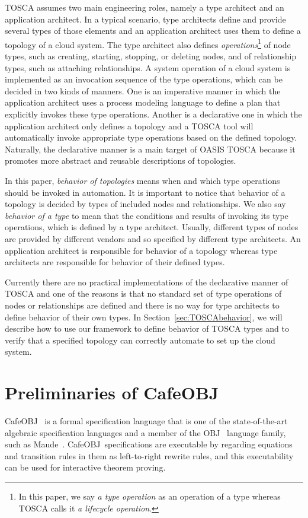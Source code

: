 \documentclass[12pt]{report}
\newcommand{\cafeobj}{{\sf CafeOBJ}~}
\begin{document}
TOSCA assumes two main engineering roles, namely a type architect and an
application architect. In a typical scenario, type architects define
and provide several types of those elements and an application
architect uses them to define a topology of a cloud system. The
type architect also defines {\it operations}\footnote{In this paper, we say
  {\it a type operation} as an operation of a type whereas TOSCA calls
  it {\it a lifecycle operation}.} of node types, such as creating,
starting, stopping, or deleting nodes, and of relationship types, such
as attaching relationships. A system operation of a cloud system
is implemented as an invocation sequence of the type operations, which
can be decided in two kinds of manners. One is an imperative manner in
which the application architect uses a process modeling language to
define a plan that explicitly invokes these type operations. Another
is a declarative one in which the application architect only defines a
topology and a TOSCA tool will automatically invoke appropriate type
operations based on the defined topology. Naturally, the declarative
manner is a main target of OASIS TOSCA because it promotes more
abstract and reusable descriptions of topologies.

In this paper, {\it behavior of topologies} means when
and which type operations should be invoked in automation. It is
important to notice that behavior of a topology is decided by
types of included nodes and relationships. We also say
{\it behavior of a type} to mean that the conditions and
results of invoking its type operations, which is defined by a type
architect. Usually, different types of nodes are provided by different
vendors and so specified by different type architects. An application
architect is responsible for behavior of a topology
whereas type architects are responsible for behavior of
their defined types.

Currently there are no practical implementations of the declarative
manner of TOSCA and one of the reasons is that no standard set of type
operations of nodes or relationships are defined and there is no way
for type architects to define behavior of their own types.  In
Section~\ref{sec:TOSCAbehavior}, we will describe how to use our
framework to define behavior of TOSCA types and to verify that a
specified topology can correctly automate to set up the cloud system.

\chapter{Preliminaries of \cafeobj}
\label{chap:pre}
\cafeobj\cite{cafeobj} is a formal specification language that is one
of the state-of-the-art algebraic specification languages and a member
of the {\sf OBJ}~\cite{OBJ} language family, such as {\sf
  Maude}~\cite{Maude14}.  \cafeobj specifications are executable by
regarding equations and transition rules in them as left-to-right
rewrite rules, and this executability can be used for interactive
theorem proving.
\end{document}
